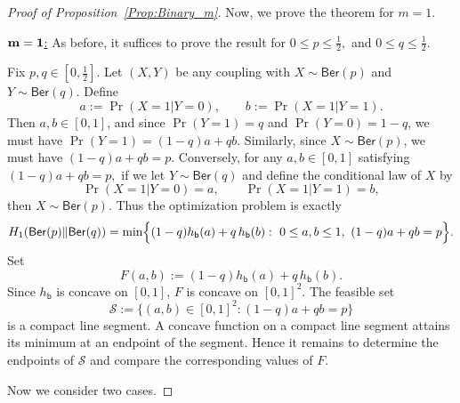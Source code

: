 \documentclass[10pt,a4paper]{amsart}
\newcommand{\Ber}{\mathsf{Ber}}
\begin{document}
\begin{proof}[Proof of Proposition~\ref{Prop:Binary_m}]
Now, we prove the theorem for $m=1$.

\noindent\underline{$\bf m= 1$:} 
As before, it suffices to prove the result for \(0\le p\le \tfrac12,\) and \(0\le q\le \tfrac12.\) 



Fix $p,q\in[0,\frac12]$. Let $(X,Y)$ be any coupling with
\(X\sim \Ber(p)\) and \(Y\sim \Ber(q).\) Define
\[a:=\Pr(X=1| Y=0),
\qquad b:=\Pr(X=1| Y=1).\]
Then $a,b\in[0,1]$, and since $\Pr(Y=1)=q$ and $\Pr(Y=0)=1-q$, we must have \(\Pr(Y=1)=(1-q)a+qb.\) Similarly, since $X\sim \Ber(p)$, we must have \((1-q)a+qb=p.\)
Conversely, for any $a,b\in[0,1]$ satisfying
\((1-q)a+qb=p,\) if we let $Y\sim \Ber(q)$ and define the conditional law of $X$ by
\[\Pr(X=1| Y=0)=a,\qquad \Pr(X=1| Y=1)=b,\] then $X\sim \Ber(p)$.
Thus the optimization problem is exactly
\[H_1(\Ber(p)\|\Ber(q))
= \min\Bigl\{(1-q)h_{\mathsf{b}}(a)+q\,h_{\mathsf{b}}(b):\ 0\le a,b\le 1,\ (1-q)a+qb=p\Bigr\}.\]
Set
\[F(a,b):=(1-q)h_{\mathsf{b}}(a)+q\,h_{\mathsf{b}}(b).\]
Since $h_{\mathsf{b}}$ is concave on $[0,1]$, $F$ is concave on $[0,1]^2$. The feasible set
\[\mathcal S:=\{(a,b)\in[0,1]^2:(1-q)a+qb=p\}\]
is a compact line segment. A concave function on a compact line segment attains its minimum at an endpoint of the segment. Hence it remains to determine the endpoints of $\mathcal S$ and compare the corresponding values of $F$.

Now we consider two cases. 

\end{proof}
\end{document}
